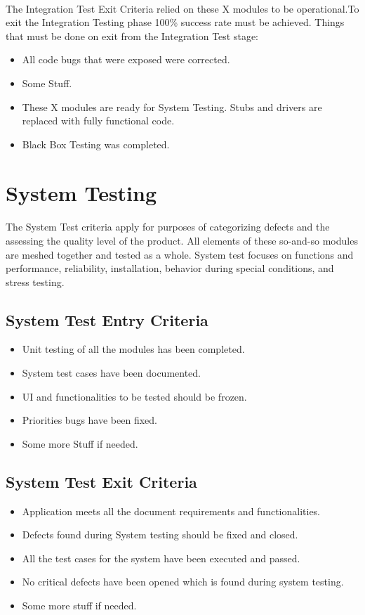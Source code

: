 \documentclass[a4paper,10pt]{scrreprt}
\begin{document}
\paragraph{}
The Integration Test Exit Criteria relied on these X modules to be operational.To exit the Integration Testing phase 100\% success rate must be achieved. Things that must be done on exit from the Integration Test stage:
\begin{itemize}
	\item All code bugs that were exposed were corrected.
	\item Some Stuff.
	\item These X modules are ready for System Testing. Stubs and drivers are replaced with fully functional code.
	\item Black Box Testing was completed.
\end{itemize}
\section{System Testing}
\paragraph{}
The System Test criteria apply for purposes of categorizing defects and the assessing the quality level of the product. All elements of these so-and-so modules are meshed together and tested as a whole. System test focuses on functions and performance, reliability, installation, behavior during special conditions, and stress testing.
\subsection{System Test Entry Criteria}
\begin{itemize}
	\item Unit testing of all the modules has been completed.
	\item System test cases have been documented.
	\item UI and functionalities to be tested should be frozen.
	\item Priorities bugs have been fixed.
	\item Some more Stuff if needed.
\end{itemize}
\subsection{System Test Exit Criteria}
\begin{itemize}
	\item Application meets all the document requirements and functionalities.
	\item Defects found during System testing should be fixed and closed.
	\item All the test cases for the system have been executed and passed.
	\item No critical defects have been opened which is found during system testing.
	\item Some more stuff if needed.
\end{itemize}
\end{document}
